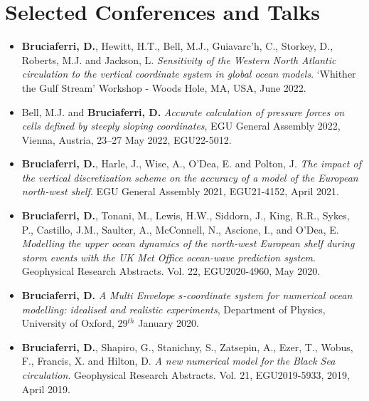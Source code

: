 \documentclass[a4paper, oneside, final]{scrartcl}
\begin{document}
\section{Selected Conferences and Talks}
\noindent
\normalsize
\begin{itemize}
\item \textbf{Bruciaferri, D.}, Hewitt, H.T., Bell, M.J., Guiavarc'h, C., Storkey, D., Roberts, M.J. and Jackson, L. \textit{Sensitivity of the Western North Atlantic circulation to the vertical coordinate system in global ocean models}. `Whither the Gulf Stream' Workshop - Woods Hole, MA, USA, June 2022.
\item Bell, M.J. and \textbf{Bruciaferri, D.} \textit{Accurate calculation of pressure forces on cells defined by steeply sloping coordinates}, EGU General Assembly 2022, Vienna, Austria, 23–27 May 2022, EGU22-5012. 
\item \textbf{Bruciaferri, D.}, Harle, J., Wise, A., O'Dea, E. and Polton, J.  \textit{The impact of the vertical discretization scheme on the accuracy of a model of the European north-west shelf}. EGU General Assembly 2021, EGU21-4152, April 2021.
\item \textbf{Bruciaferri, D.}, Tonani, M., Lewis, H.W., Siddorn, J., King, R.R., Sykes, P., Castillo, J.M., Saulter, A., McConnell, N., Ascione, I., and O'Dea, E.  \textit{Modelling the upper ocean dynamics of the north-west European shelf during storm events with the UK Met Office ocean-wave prediction system}. Geophysical Research Abstracts. Vol. 22, EGU2020-4960, May 2020.
\item \textbf{Bruciaferri, D.} \textit{A Multi Envelope $s$-coordinate system for numerical ocean modelling: idealised and realistic experiments}, Department of Physics, University of Oxford, 29$^{th}$ January 2020. 
\item \textbf{Bruciaferri, D.}, Shapiro, G., Stanichny, S., Zatsepin, A., Ezer, T., Wobus, F., Francis, X. and Hilton, D. \textit{A new numerical model for the Black Sea circulation}. Geophysical Research Abstracts. Vol. 21, EGU2019-5933, 2019, April 2019.

\end{itemize}
\end{document}
